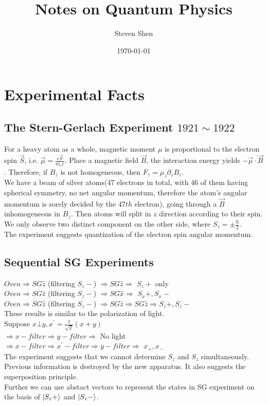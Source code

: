 \documentclass[a4paper, 11pt]{article}
\title{\textbf{Notes on Quantum Physics}}
\author{Steven Shen}
\date{\today}
\begin{document}
\maketitle

\section{Experimental Facts}
\subsection{The Stern-Gerlach Experiment $1921 \sim 1922$}
For a heavy atom as a whole, magnetic moment $\mu$ is proportional to the electron spin $\overrightarrow{S}$, i.e. 
$\overrightarrow{\mu} = \frac{e\overrightarrow{S}}{m_e c}$. Place a magnetic field $\overrightarrow{B}$, the interaction energy yields $ - \overrightarrow{\mu} \cdot \overrightarrow{B}$. Therefore, if $B_z$ is not homogeneous, then $F_z = \mu_z \partial_z B_z$.\\
\indent We have a beam of silver atoms(47 electrons in total, with 46 of them having spherical symmetry, no net angular momentum, therefore the atom's angular momentum is sorely decided by the $47th$ electron), going through a $\overrightarrow{B}$ inhomogeneous in $B_z$. Then atoms will split in $z$ direction according to their spin. We only observe two distinct component on the other side, where $S_z = \pm \frac{\hbar}{2}$.\\
\indent The experiment suggests quantization of the electron spin angular momentum.
\subsection{Sequential SG Experiments}
$Oven \Longrightarrow SG\hat{z}$ (filtering $S_z -$) $\Longrightarrow SG\hat{z} \Longrightarrow$ $S_z +$ only \\
\indent $Oven \Longrightarrow SG\hat{z}$ (filtering $S_z -$) $\Longrightarrow SG\hat{x} \Longrightarrow$ $S_x+, S_x -$ \\
\indent $Oven \Longrightarrow SG\hat{z}$ (filtering $S_z -$) $\Longrightarrow SG\hat{z} \Longrightarrow SG\hat{z} \Longrightarrow S_z +, S_z -$ \\
\indent These results is similar to the polarization of light.\\
\indent Suppose $x \bot y, x^{\prime}=\frac{1}{\sqrt{2}}(x + y)$ \\                                                  $\Longrightarrow x-filter \Longrightarrow y-filter \Longrightarrow$ No light \\
$\Longrightarrow x-filter \Longrightarrow  x^{\prime}-filter \Longrightarrow y-filter \Longrightarrow$ $x_+, x_-$ \\
\indent The experiment suggests that we cannot determine $S_z$ and $S_z$ simultaneously. Previous information is destroyed by the new apparatus. It also suggests the superposition principle.\\
\indent Further we can use abstact vectors to represent the states in SG experiment on the basis of $\ket{S_z +}$ and $\ket{S_z -}$.
\end{document}
